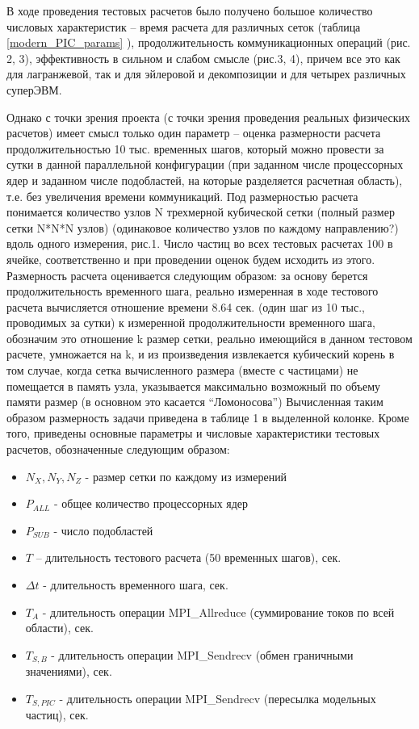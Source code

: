 В ходе проведения тестовых расчетов было получено большое количество числовых характеристик – время расчета для различных сеток (таблица \ref{modern_PIC_params} ), продолжительность коммуникационных операций (рис. 2, 3), эффективность в сильном и слабом смысле (рис.3, 4), причем все это как для лагранжевой, так и для эйлеровой и декомпозиции и для четырех различных суперЭВМ. 






Однако с точки зрения проекта (с точки зрения проведения реальных физических расчетов) имеет смысл только один параметр – оценка размерности расчета продолжительностью 10 тыс. временных шагов,  который можно провести за сутки в данной параллельной конфигурации (при заданном числе процессорных ядер и заданном числе подобластей, на которые разделяется расчетная область), т.е. без увеличения времени коммуникаций. Под размерностью расчета понимается количество узлов N трехмерной кубической сетки (полный размер сетки N*N*N узлов) (одинаковое количество узлов по каждому направлению?) вдоль одного измерения, рис.1. Число частиц во всех тестовых расчетах 100 в ячейке, соответственно и при проведении оценок будем исходить из этого. Размерность расчета оценивается следующим образом:
за основу берется продолжительность временного шага, реально измеренная в ходе тестового расчета
вычисляется отношение времени 8.64 сек. (один шаг из 10 тыс., проводимых за сутки) к измеренной продолжительности временного шага, обозначим это отношение k
размер сетки, реально имеющийся в данном тестовом расчете, умножается на k, и из произведения извлекается кубический корень
в том случае, когда сетка вычисленного размера (вместе с частицами) не помещается в память узла, указывается максимально возможный по объему памяти размер (в основном это касается “Ломоносова”)
Вычисленная таким образом размерность задачи приведена в таблице 1 в выделенной колонке. Кроме того, приведены основные параметры и числовые характеристики тестовых расчетов, обозначенные следующим образом:
\begin{itemize}
\item $N_X, N_Y, N_Z$  - размер сетки по каждому из измерений
\item $P_{ALL}$  - общее количество процессорных ядер
\item $P_{SUB}$  - число подобластей
\item $T$ – длительность тестового расчета (50 временных шагов), сек.
\item $\Delta t$  - длительность временного шага, сек.
\item $T_{A}$ - длительность операции MPI\_Allreduce (суммирование токов по всей области), сек.
\item $T_{S,B}$ - длительность операции MPI\_Sendrecv (обмен граничными значениями), сек.
\item $T_{S,PIC}$ - длительность операции MPI\_Sendrecv (пересылка модельных частиц), сек.
\end{itemize}
	


